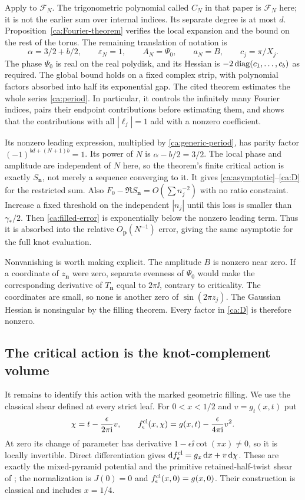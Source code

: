 Apply \cite[Theorem 1.1]{Filling} to $\mathcal F_N$.
The trigonometric polynomial called $C_N$ in that paper is
$\mathcal F_N$ here; it is not the earlier sum over internal indices.
Its separate degree is at most $d$. Proposition~\ref{ca:Fourier-theorem}
verifies the local expansion and the bound on the rest of the torus.
The remaining translation of notation is
\[
 \alpha=3/2+b/2,\qquad \varepsilon_N=1,\qquad
 A_N=\Psi_0,\qquad a_N=B,\qquad c_j=\pi/X_j.
\]
The phase $\Psi_0$ is real on the real polydisk, and its Hessian
is $-2\operatorname{diag}(c_1,\ldots,c_b)$ as required. The global bound holds
on a fixed complex strip, with polynomial factors absorbed into half
its exponential gap. The cited theorem estimates the whole series
\eqref{ca:period}. In particular, it controls the infinitely many
Fourier indices, pairs their endpoint contributions before estimating
them, and shows that the contributions with all $|\ell_j|=1$
add with a nonzero coefficient.

Its nonzero leading expression, multiplied by \eqref{ca:generic-period}, has parity factor
$(-1)^{bd+(N+1)b}=1$. Its power of $N$ is
$\alpha-b/2=3/2$. The local phase and amplitude are independent of $N$ here, so the theorem's finite critical action is exactly $S_{\mathbf n}$, not merely a sequence converging to it. It gives
\eqref{ca:asymptotic}--\eqref{ca:D} for the restricted sum. Also
$F_0-\Re S_{\mathbf n}=O(\sum n_j^{-2})$ with no ratio constraint.
Increase a fixed threshold on the independent $|n_j|$ until this loss is smaller than $\gamma_*/2$. Then \eqref{ca:filled-error} is exponentially below the nonzero leading term. Thus it is absorbed into the relative $O_{\mathbf p}(N^{-1})$
error, giving the same asymptotic for the full knot evaluation.

Nonvanishing is worth making explicit. The amplitude $B$ is nonzero
near zero. If a coordinate of $z_{\mathbf n}$ were zero, separate
evenness of $\Psi_0$ would make the corresponding derivative of
$T_{\mathbf n}$ equal to $2\pi\ii$, contrary to criticality.
The coordinates are small, so none is another zero of
$\sin(2\pi z_j)$. The Gaussian Hessian is nonsingular by the filling
theorem. Every factor in \eqref{ca:D} is therefore nonzero.

\subsection{The critical action is the knot-complement volume}

It remains to identify this action with the marked geometric filling.
We use the classical shear defined at every strict leaf. For $0<x<1/2$ and $v=g_t(x,t)$ put
\[
 \chi=t-\frac{\epsilon}{2\pi\mathrm i}v,\qquad
 f_\epsilon^{\rm cl}(x,\chi)
        =g(x,t)-\frac{\epsilon}{4\pi\mathrm i}v^2.
\]
At zero its change of parameter has derivative
$1-\epsilon\ii\cot(\pi x)\ne0$, so it is locally invertible.
Direct differentiation gives
$\mathrm d f_\epsilon^{\rm cl}=g_x\,\mathrm d x+v\,\mathrm d\chi$.
These are exactly the mixed-pyramid potential and the
primitive retained-half-twist shear of
\cite[Section 6, equations (6.1)--(6.5)]{StrictGeometry};
the normalization is $J(0)=0$ and $f_\epsilon^{\rm cl}(x,0)=g(x,0)$.
Their construction is classical and includes $x=1/4$.

